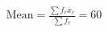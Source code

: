 \documentclass[preview]{standalone}
\begin{document}
\begin{align*}
\text{Mean} = \frac{\sum f_r x_r}{\sum f_r} = 60
\end{align*}
\end{document}
